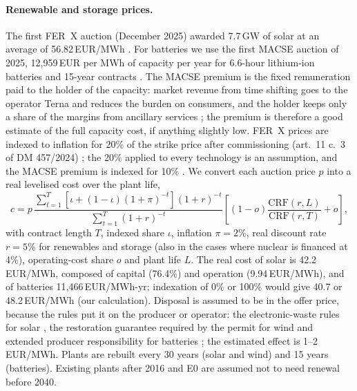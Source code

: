 \paragraph{Renewable and storage prices.} The first FER~X auction (December 2025) awarded 7.7\,GW of solar at an average of 56.82\,EUR/MWh \citep{FERXmain2025}. For batteries we use the first MACSE auction of 2025, 12{,}959\,EUR per MWh of capacity per year for 6.6-hour lithium-ion batteries and 15-year contracts \citep{MACSE2025}. The MACSE premium is the fixed remuneration paid to the holder of the capacity: market revenue from time shifting goes to the operator Terna and reduces the burden on consumers, and the holder keeps only a share of the margins from ancillary services \citep{ARERA247}; the premium is therefore a good estimate of the full capacity cost, if anything slightly low. FER~X prices are indexed to inflation for 20\% of the strike price after commissioning (art.\ 11 c.\ 3 of DM 457/2024) \citep{FERXrules2025,FERXindex}; the 20\% applied to every technology is an assumption, and the MACSE premium is indexed for 10\% \citep{MACSErules}. We convert each auction price $p$ into a real levelised cost over the plant life,
\begin{equation}
c = p\,\frac{\sum_{t=1}^{T}\left[\iota+(1-\iota)(1+\pi)^{-t}\right](1+r)^{-t}}{\sum_{t=1}^{T}(1+r)^{-t}}\left[(1-o)\frac{\mathrm{CRF}(r,L)}{\mathrm{CRF}(r,T)}+o\right],\label{eq:conv}
\end{equation}
with contract length $T$, indexed share $\iota$, inflation $\pi=2\%$, real discount rate $r=5\%$ for renewables and storage (also in the cases where nuclear is financed at 4\%), operating-cost share $o$ and plant life $L$. The real cost of solar is 42.2\,EUR/MWh, composed of capital (76.4\%) and operation (9.94\,EUR/MWh), and of batteries 11{,}466\,EUR/MWh-yr; indexation of 0\% or 100\% would give 40.7 or 48.2\,EUR/MWh (our calculation). Disposal is assumed to be in the offer price, because the rules put it on the producer or operator: the electronic-waste rules for solar \citep{RAEE}, the restoration guarantee required by the permit for wind \citep{WindRestoration} and extended producer responsibility for batteries \citep{BatteryReg}; the estimated effect is 1--2\,EUR/MWh. Plants are rebuilt every 30 years (solar and wind) and 15 years (batteries). Existing plants after 2016 and E0 are assumed not to need renewal before 2040.

